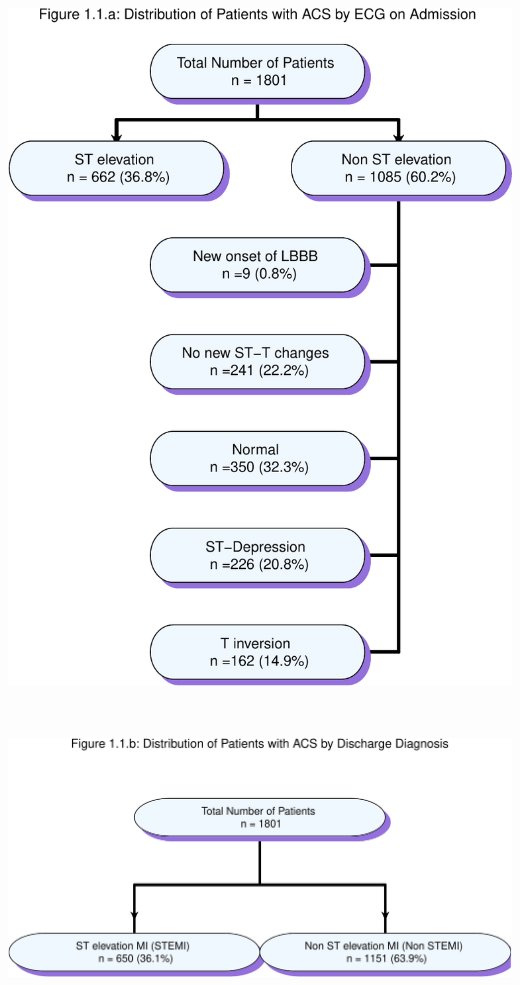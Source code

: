 \documentclass[
]{article}
\begin{document}
\includegraphics{ACSIS_2024_v1_pdf_files/figure-latex/unnamed-chunk-6-1.pdf}

\pagebreak

~

\includegraphics{ACSIS_2024_v1_pdf_files/figure-latex/unnamed-chunk-7-1.pdf}

\pagebreak
\end{document}
